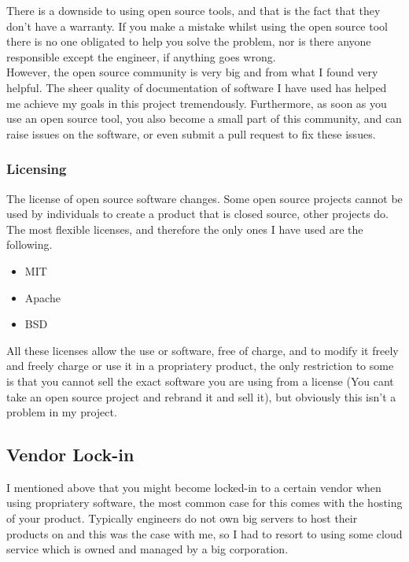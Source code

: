 \documentclass[titlepage]{article}
\begin{document}
There is a downside to using open source tools, and that is the fact that they don't have a warranty. If you make a mistake whilst using the open source tool there is no one obligated to help you solve the problem, nor is there anyone responsible except the engineer, if anything goes wrong.  \\

However, the open source community is very big and from what I found very helpful. The sheer quality of documentation of software I have used has helped me achieve my goals in this project tremendously. Furthermore, as soon as you use an open source tool, you also become a small part of this community, and can raise issues on the software, or even submit a pull request to fix these issues. 

\subsubsection{Licensing}
The license of open source software changes. Some open source projects cannot be used by individuals to create a product that is closed source, other projects do. The most flexible licenses, and therefore the only ones I have used are the following.

\begin{itemize}
  \item MIT~\cite{mit}
  \item Apache~\cite{apache}
  \item BSD~\cite{bsd}
\end{itemize}

All these licenses allow the use or software, free of charge, and to modify it freely and freely charge or use it in a propriatery product, the only restriction to some is that you cannot sell the exact software you are using from a license (You cant take an open source project and rebrand it and sell it), but obviously this isn't a problem in my project.

\subsection{Vendor Lock-in}
I mentioned above that you might become locked-in to a certain vendor when using propriatery software, the most common case for this comes with the hosting of your product. Typically engineers do not own big servers to host their products on and this was the case with me, so I had to resort to using some cloud service which is owned and managed by a big corporation. \\
\end{document}
